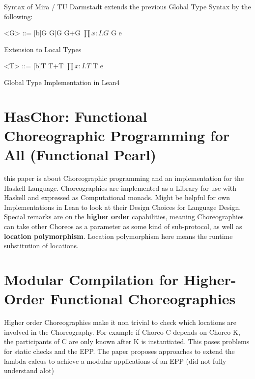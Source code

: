 Syntax of Mira / TU Darmstadt
extends the previous Global Type Syntax by the following:
\begin{grammar}

<G> ::= [b]G
	\alt G|G
	\alt G+G
	\alt $\prod x:I.G$
	\alt G e

\end{grammar}

Extension to Local Types
\begin{grammar}

<T> ::= [b]T
	\alt T+T
	\alt $\prod x:I.T$
	\alt T e

\end{grammar}

Global Type Implementation in Lean4


\section{HasChor: Functional Choreographic Programming for All
(Functional Pearl)}
this paper is about Choreographic programming and an implementation for the Haskell Language. Choreographies are implemented as a Library for use with Haskell and expressed as Computational monads. Might be helpful for own Implementations in Lean to look at their Design Choices for Language Design. Special remarks are on the \textbf{higher order} capabilities, meaning Choreographies can take other Choreos as a parameter as some kind of sub-protocol, as well as \textbf{location polymorphism}. Location polymorphism here means the runtime substitution of locations.

\section{Modular Compilation for Higher-Order Functional Choreographies}
Higher order Choreographies make it non trivial to check which locations are involved in the Choreography. For example if Choreo C depends on Choreo K, the participants of C are only known after K is instantiated. This poses problems for static checks and the EPP. The paper proposes approaches to extend the lambda calcus to achieve a modular applications of an EPP (did not fully understand alot)

